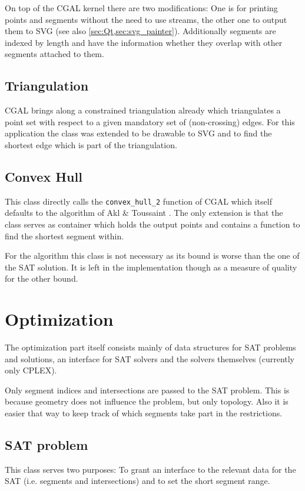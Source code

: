 On top of the CGAL kernel there are two modifications: One is for
printing points and segments without the need to use streams, the
other one to output them to SVG (see also
\cref{sec:Qt,sec:svg_painter}). Additionally segments are indexed by
length and have the information whether they overlap with other
segments attached to them.

\subsection{Triangulation}
CGAL brings along a constrained triangulation already
\cite{cgal_manual_constrained_triangulation}
which triangulates a point set with respect to a given mandatory set
of (non-crossing) edges. For this application the class was extended
to be drawable to SVG and to find the shortest edge which is part of
the triangulation.

\subsection{Convex Hull}
This class directly calls the \verb|convex_hull_2| function of CGAL
\cite{cgal_manual_convex_hull} which itself defaults to the algorithm
of Akl \& Toussaint \cite{convex_hull}. The only extension is that
the class serves as container
which holds the output points and contains a function to find the 
shortest segment within.

For the algorithm this class is not necessary as its bound is worse
than the one of the SAT solution. It is left in the implementation
though as a measure of quality for the other bound.

\section{Optimization}
The optimization part itself consists mainly of data structures for
SAT problems and solutions, an interface for SAT solvers and the
solvers themselves (currently only CPLEX).

Only segment indices and intersections are passed to the SAT problem.
This is because geometry does not influence the problem, but only
topology. Also it is easier that way to keep track of which segments
take part in the restrictions.

\subsection{SAT problem}
This class serves two purposes: To grant an interface to the relevant
data for the SAT (i.e. segments and intersections) and to set the
short segment range.

